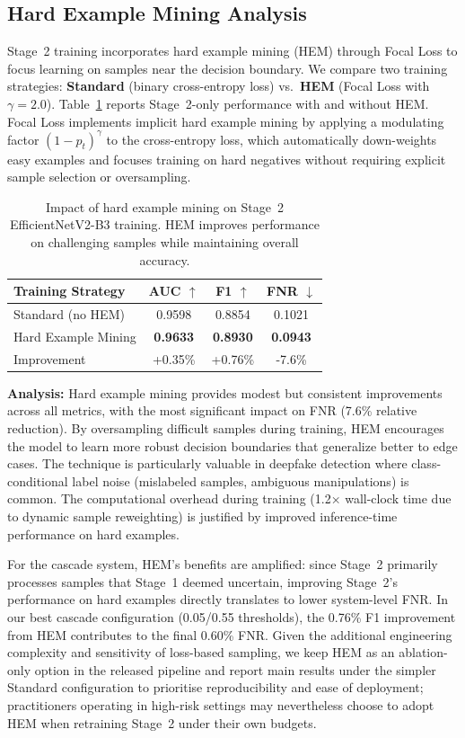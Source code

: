 \subsection{Hard Example Mining Analysis}

Stage~2 training incorporates hard example mining (HEM) through Focal Loss to focus learning on samples near the decision boundary. We compare two training strategies: \textbf{Standard} (binary cross-entropy loss) vs.\ \textbf{HEM} (Focal Loss with $\gamma=2.0$). Table~\ref{tab:ablation_hem} reports Stage~2\hyp only performance with and without HEM. Focal Loss implements implicit hard example mining by applying a modulating factor $(1-p_t)^\gamma$ to the cross-entropy loss, which automatically down-weights easy examples and focuses training on hard negatives without requiring explicit sample selection or oversampling.

\begin{table}[h]
\centering
\caption{Impact of hard example mining on Stage~2 EfficientNetV2\hyp B3 training. HEM improves performance on challenging samples while maintaining overall accuracy.}
\label{tab:ablation_hem}
\begin{tabular}{@{}lccc@{}}
\toprule
Training Strategy & AUC $\uparrow$ & F1 $\uparrow$ & FNR $\downarrow$ \\
\midrule
Standard (no HEM) & 0.9598 & 0.8854 & 0.1021 \\
Hard Example Mining & \textbf{0.9633} & \textbf{0.8930} & \textbf{0.0943} \\
\midrule
Improvement & +0.35\% & +0.76\% & -7.6\% \\
\bottomrule
\end{tabular}
\end{table}

\textbf{Analysis:}
Hard example mining provides modest but consistent improvements across all metrics, with the most significant impact on FNR (7.6\% relative reduction). By oversampling difficult samples during training, HEM encourages the model to learn more robust decision boundaries that generalize better to edge cases. The technique is particularly valuable in deepfake detection where class\hyp conditional label noise (mislabeled samples, ambiguous manipulations) is common. The computational overhead during training (1.2× wall\hyp clock time due to dynamic sample reweighting) is justified by improved inference\hyp time performance on hard examples.

For the cascade system, HEM's benefits are amplified: since Stage~2 primarily processes samples that Stage~1 deemed uncertain, improving Stage~2's performance on hard examples directly translates to lower system\hyp level FNR. In our best cascade configuration (0.05/0.55 thresholds), the 0.76\% F1 improvement from HEM contributes to the final 0.60\% FNR. Given the additional engineering complexity and sensitivity of loss\hyp based sampling, we keep HEM as an ablation\hyp only option in the released pipeline and report main results under the simpler Standard configuration to prioritise reproducibility and ease of deployment; practitioners operating in high\hyp risk settings may nevertheless choose to adopt HEM when retraining Stage~2 under their own budgets.

